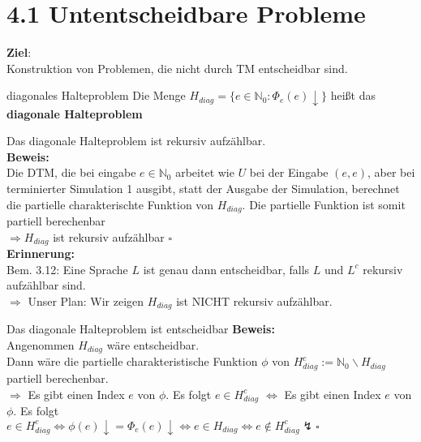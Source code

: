 
\section*{4.1 Untentscheidbare Probleme}

\textbf{Ziel}: \\
Konstruktion von Problemen, die nicht durch TM entscheidbar sind.

\begin{defn}{diagonales Halteproblem}
    Die Menge $H_{diag} = \{e \in \mathbb{N}_0 : \Phi_e(e) \downarrow\}$ heißt das \textbf{diagonale Halteproblem}
\end{defn}

\begin{prop}{}
    Das diagonale Halteproblem ist rekursiv aufzählbar. \\
    
    \textbf{Beweis:} \\
    Die DTM, die bei eingabe $e \in \mathbb{N}_0$ arbeitet wie $U$ bei
    der Eingabe $(e,e)$, aber bei terminierter Simulation 1 ausgibt, statt der
    Ausgabe der Simulation, berechnet die partielle charakterischte Funktion von $H_{diag}$.
    Die partielle Funktion ist somit partiell berechenbar \\
    $\Rightarrow H_{diag}$ ist rekursiv aufzählbar $\square$ \\

    \textbf{Erinnerung:} \\
    Bem. 3.12: Eine Sprache $L$ ist genau dann entscheidbar, falls $L$ und $L^c$
    rekursiv aufzählbar sind. \\

    $\Rightarrow$ Unser Plan: Wir zeigen $H_{diag}$ ist NICHT rekursiv aufzählbar.
\end{prop}

\begin{satz}{Das diagonale Halteproblem ist entscheidbar}
    \textbf{Beweis:} \\
    Angenommen $H_{diag}$ wäre entscheidbar. \\
    Dann wäre die partielle charakteristische Funktion $\phi$ von $H_{diag}^c := \mathbb{N}_0 \backslash H_{diag}$
    partiell berechenbar. \\

    $\Rightarrow$ Es gibt einen Index $e$ von $\phi$. Es folgt $e \in H_{diag}^c$
    $\Leftrightarrow$ Es gibt einen Index $e$ von $\phi$. Es folgt \\
    $e \in H_{diag}^c \Leftrightarrow \phi(e)\downarrow = \Phi_e(e)\downarrow \Leftrightarrow e \in H_{diag} \Leftrightarrow e \notin H_{diag}^c \lightning \square$



\end{satz}